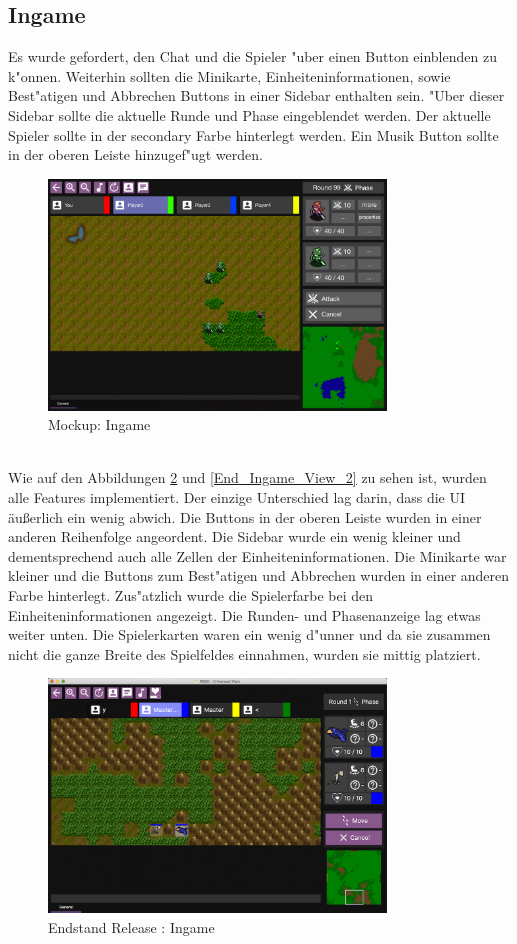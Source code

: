 \documentclass[12pt, titlepage]{scrartcl}
\newcommand{\RN}[1]{%
	\textup{\uppercase\expandafter{\romannumeral#1}}%
}
\begin{document}
		\subsection{Ingame}
			Es wurde gefordert, den Chat und die Spieler "uber einen Button einblenden zu k"onnen. Weiterhin sollten die Minikarte, Einheiteninformationen, sowie Best"atigen und Abbrechen Buttons in einer Sidebar enthalten sein. "Uber dieser Sidebar sollte die aktuelle Runde und Phase eingeblendet werden. Der aktuelle Spieler sollte in der secondary Farbe hinterlegt werden. Ein Musik Button sollte in der oberen Leiste hinzugef"ugt werden.
			\begin{figure}[H] 
				\centering
				\includegraphics[width=0.8\textwidth]{images/mockups/Ingame.png}
				\caption{Mockup: Ingame}
				\label{Ingame_View_2}
			\end{figure}
			\ \\ Wie auf den Abbildungen \ref{End_Ingame_View} und \ref{End_Ingame_View_2} zu sehen ist, wurden alle Features implementiert. Der einzige Unterschied lag darin, dass die UI \"au{\ss}erlich ein wenig abwich. Die Buttons in der oberen Leiste wurden in einer anderen Reihenfolge angeordent. Die Sidebar wurde ein wenig kleiner und dementsprechend auch alle Zellen der Einheiteninformationen. Die Minikarte war kleiner und die Buttons zum Best"atigen und Abbrechen wurden in einer anderen Farbe hinterlegt. Zus"atzlich wurde die Spielerfarbe bei den Einheiteninformationen angezeigt. Die Runden- und Phasenanzeige lag etwas weiter unten. Die Spielerkarten waren ein wenig d"unner und da sie zusammen nicht die ganze Breite des Spielfeldes einnahmen, wurden sie mittig platziert.
			\begin{figure}[H] 
				\centering
				\includegraphics[width=0.8\textwidth]{images/endOfRelease/Ingame.png}
				\caption{Endstand Release \RN{3}: Ingame}
				\label{End_Ingame_View}
			\end{figure}
\end{document}
